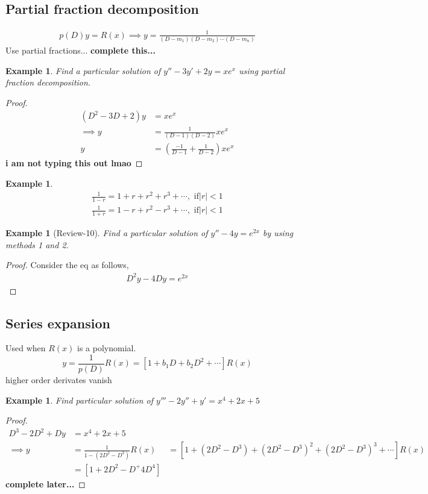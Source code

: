 \documentclass[oneside,11pt,pdftex,final]{book}%
\numberwithin{equation}{section}
\newtheorem{example}[theorem]{Example}
\numberwithin{section}{chapter}
\numberwithin{equation}{chapter}
\begin{document}
\subsection{Partial fraction decomposition}
\begin{align*}
	p(D)y=R(x)\implies y=\frac{1}{(D-m_1)(D-m_2)\cdots (D-m_n)}
\end{align*}
Use partial fractions... \textbf{complete this...}

\begin{example}
	Find a particular solution of $ y''-3y'+2y=xe^x $ using partial fraction decomposition.
\end{example}
\begin{proof}
	\begin{align*}
		(D^2-3D+2)y&=xe^x\\
		\implies y &= \frac{1}{(D-1)(D-2)}xe^x\\
		y&=\left(\frac{-1}{D-1}+\frac{1}{D-2}\right) xe^{x}
	\end{align*}
\textbf{i am not typing this out lmao}
\end{proof}

\begin{example}
	\begin{align*}
		\frac{1}{1-r}=1+r+r^2+r^3+\cdots, \text{ if} |r|<1\\
		\frac{1}{1+r}=1-r+r^2-r^3+\cdots, \text{ if} |r|<1
	\end{align*}
\end{example}

\begin{example}[Review-10]
	Find a particular solution of $ y''-4y=e^{2x} $ by using methods 1 and 2.
\end{example}
\begin{proof}
	Consider the eq as follows,
	\begin{align*}
		D^2y-4Dy=e^{2x}
	\end{align*}
\end{proof}


\subsection{Series expansion}
Used when $ R(x) $ is a polynomial.
\[ y=\frac{1}{p(D)} R(x) = [1+b_1D+b_2D^2+\cdots]R(x)\] higher order derivates vanish

\begin{example}
	Find particular solution of $ y'''-2y''+y'=x^4+2x+5 $
\end{example}
\begin{proof}
	\begin{align*}
		D^3-2D^2+Dy&=x^4+2x+5\\
		\implies y&= \frac{1}{1-(2D^2-D^3)} R(x)
		&=\left[1+(2D^2-D^3)+(2D^2-D^3)^2+(2D^2-D^3)^3+\cdots \right] R(x)\\
		&=\left[1+2D^2-D^+4D^4\right]
	\end{align*}
	\textbf{complete later...}
\end{proof}
\end{document}
